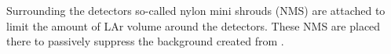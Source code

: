 \documentclass[encoding=utf8,british]{tumphthesis}
\begin{document}

Surrounding the detectors so-called nylon mini shrouds (NMS) are attached to limit the amount of LAr volume around the detectors.
These NMS are placed there to passively suppress the background created from .
\end{document}
